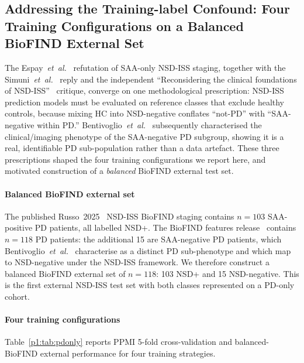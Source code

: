 \subsection{Addressing the Training-label Confound: Four Training Configurations on a Balanced BioFIND External Set}
\label{p1:sec:results:pdonly}

The Espay~\textit{et~al.}~\cite{espay2025refutation} refutation of SAA-only NSD-ISS staging, together with the Simuni~\textit{et~al.}~\cite{simuni2025reply} reply and the independent ``Reconsidering the clinical foundations of NSD-ISS''~\cite{reconsider2025nsd} critique, converge on one methodological prescription: NSD-ISS prediction models must be evaluated on reference classes that exclude healthy controls, because mixing HC into NSD-negative conflates ``not-PD'' with ``SAA-negative within PD.'' Bentivoglio~\textit{et~al.}~\cite{bentivoglio2026saaneg} subsequently characterised the clinical/imaging phenotype of the SAA-negative PD subgroup, showing it is a real, identifiable PD sub-population rather than a data artefact. These three prescriptions shaped the four training configurations we report here, and motivated construction of a \emph{balanced} BioFIND external test set.

\paragraph*{Balanced BioFIND external set} The published Russo~2025~\cite{russo2025} NSD-ISS BioFIND staging contains $n{=}103$ SAA-positive PD patients, all labelled NSD+. The BioFIND features release~\cite{biofind2025nsd} contains $n{=}118$ PD patients: the additional 15 are SAA-negative PD patients, which Bentivoglio~\textit{et~al.}~\cite{bentivoglio2026saaneg} characterise as a distinct PD sub-phenotype and which map to NSD-negative under the NSD-ISS framework. We therefore construct a balanced BioFIND external set of $n{=}118$: 103 NSD+ and 15 NSD-negative. This is the first external NSD-ISS test set with both classes represented on a PD-only cohort.

\paragraph*{Four training configurations} Table~\ref{p1:tab:pdonly} reports PPMI 5-fold cross-validation and balanced-BioFIND external performance for four training strategies.

